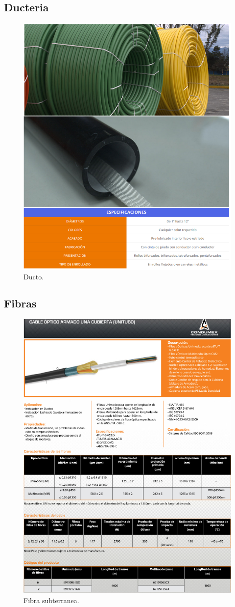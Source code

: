 \documentclass[12pt,letterpaper]{article}
\begin{document}
\subsection{Ducteria}
\begin{figure}[ht]
    \centering
    \includegraphics[width=.7\textwidth]{imagenes/ductos.PNG}
    \caption{Ducto.}
\end{figure}

\newpage
\subsection{Fibras}
\begin{figure}[ht]
    \centering
    \includegraphics[width=.67\textwidth]{imagenes/fibra1.PNG}
    \caption{Fibra subterranea.}
\end{figure}
\end{document}
